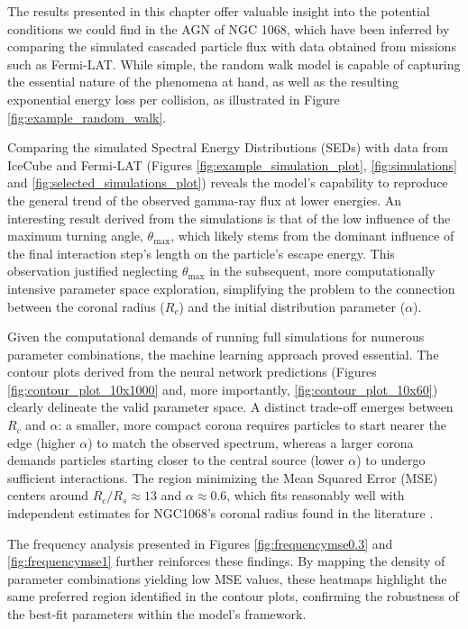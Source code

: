 The results presented in this chapter offer valuable insight into the potential conditions we could find in the AGN of NGC 1068, which have been inferred by comparing the simulated cascaded particle flux with data obtained from missions such as Fermi-LAT. While simple, the random walk model is capable of capturing the essential nature of the phenomena at hand, as well as the resulting exponential energy loss per collision, as illustrated in Figure \ref{fig:example_random_walk}. 

Comparing the simulated Spectral Energy Distributions (SEDs) with data from IceCube and Fermi-LAT (Figures \ref{fig:example_simulation_plot}, \ref{fig:simulations} and \ref{fig:selected_simulations_plot}) reveals the model's capability to reproduce the general trend of the observed gamma-ray flux at lower energies. An interesting result derived from the simulations is that of the low influence of the maximum turning angle, $\theta_{\max}$, which likely stems from the dominant influence of the final interaction step's length on the particle's escape energy. This observation justified neglecting $\theta_{\max}$ in the subsequent, more computationally intensive parameter space exploration, simplifying the problem to the connection between the coronal radius ($R_c$) and the initial distribution parameter ($\alpha$).

Given the computational demands of running full simulations for numerous parameter combinations, the machine learning approach proved essential. The contour plots derived from the neural network predictions (Figures \ref{fig:contour_plot_10x1000} and, more importantly, \ref{fig:contour_plot_10x60}) clearly delineate the valid parameter space. A distinct trade-off emerges between $R_c$ and $\alpha$: a smaller, more compact corona requires particles to start nearer the edge (higher $\alpha$) to match the observed spectrum, whereas a larger corona demands particles starting closer to the central source (lower $\alpha$) to undergo sufficient interactions. The region minimizing the Mean Squared Error (MSE) centers around $R_c/R_s \approx 13$ and $\alpha \approx 0.6$, which fits reasonably well with independent estimates for NGC1068's coronal radius found in the literature \citep{Eichmann_2022}.

The frequency analysis presented in Figures \ref{fig:frequencymse0.3} and \ref{fig:frequencymse1} further reinforces these findings. By mapping the density of parameter combinations yielding low MSE values, these heatmaps highlight the same preferred region identified in the contour plots, confirming the robustness of the best-fit parameters within the model's framework.

